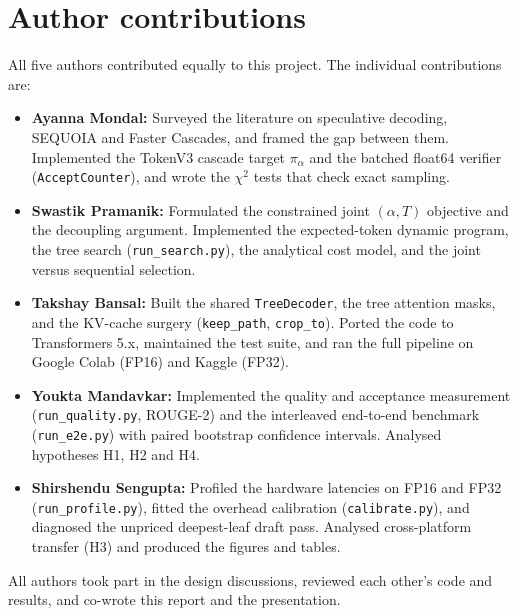 \documentclass[10pt]{article}
\newenvironment{ack}{%
  \section*{Acknowledgments and disclosure of funding}%
}{}
\begin{document}
\section*{Author contributions}

All five authors contributed equally to this project. The individual contributions are:

\begin{itemize}
    \item \textbf{Ayanna Mondal:} Surveyed the literature on speculative decoding, SEQUOIA and Faster Cascades, and framed the gap between them. Implemented the TokenV3 cascade target $\pi_\alpha$ and the batched float64 verifier (\texttt{AcceptCounter}), and wrote the $\chi^2$ tests that check exact sampling.
    \item \textbf{Swastik Pramanik:} Formulated the constrained joint $(\alpha, T)$ objective and the decoupling argument. Implemented the expected-token dynamic program, the tree search (\texttt{run\_search.py}), the analytical cost model, and the joint versus sequential selection.
    \item \textbf{Takshay Bansal:} Built the shared \texttt{TreeDecoder}, the tree attention masks, and the KV-cache surgery (\texttt{keep\_path}, \texttt{crop\_to}). Ported the code to Transformers 5.x, maintained the test suite, and ran the full pipeline on Google Colab (FP16) and Kaggle (FP32).
    \item \textbf{Youkta Mandavkar:} Implemented the quality and acceptance measurement (\texttt{run\_quality.py}, ROUGE-2) and the interleaved end-to-end benchmark (\texttt{run\_e2e.py}) with paired bootstrap confidence intervals. Analysed hypotheses H1, H2 and H4.
    \item \textbf{Shirshendu Sengupta:} Profiled the hardware latencies on FP16 and FP32 (\texttt{run\_profile.py}), fitted the overhead calibration (\texttt{calibrate.py}), and diagnosed the unpriced deepest-leaf draft pass. Analysed cross-platform transfer (H3) and produced the figures and tables.
\end{itemize}

All authors took part in the design discussions, reviewed each other's code and results, and co-wrote this report and the presentation.

\end{document}
